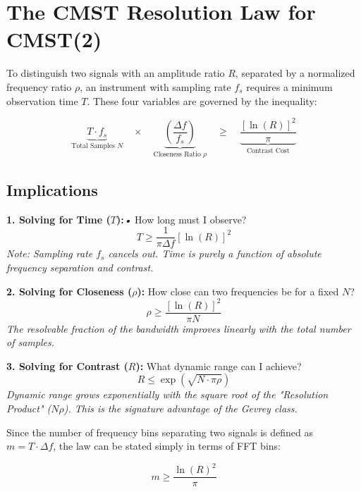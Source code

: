 \documentclass[11pt]{article}
\theoremstyle{breakdef}
\begin{document}
\section{The CMST Resolution Law for CMST(2)}

To distinguish two signals with an amplitude ratio $R$, separated by a normalized frequency ratio $\rho$, an instrument with sampling rate $f_s$ requires a minimum observation time $T$. These four variables are governed by the inequality:

\begin{equation}
    \underbrace{T \cdot f_s}_{\text{Total Samples } N} \quad \times \quad \underbrace{\left( \frac{\Delta f}{f_s} \right)}_{\text{Closeness Ratio } \rho} \quad \ge \quad \underbrace{ \frac{\left[ \ln(R) \right]^2}{\pi} }_{\text{Contrast Cost}}
\end{equation}

\subsection{Implications}

\textbf{1. Solving for Time ($T$):}\textit{\textit{•}}
How long must I observe?
\begin{equation}
    T \ge \frac{1}{\pi \Delta f} [\ln(R)]^2
\end{equation}
\textit{Note: Sampling rate $f_s$ cancels out. Time is purely a function of absolute frequency separation and contrast.}

\textbf{2. Solving for Closeness ($\rho$):}
How close can two frequencies be for a fixed $N$?
\begin{equation}
    \rho \ge \frac{[\ln(R)]^2}{\pi N}
\end{equation}
\textit{The resolvable fraction of the bandwidth improves linearly with the total number of samples.}

\textbf{3. Solving for Contrast ($R$):}
What dynamic range can I achieve?
\begin{equation}
    R \le \exp\left( \sqrt{N \cdot \pi \rho} \right)
\end{equation}
\textit{Dynamic range grows exponentially with the square root of the "Resolution Product" ($N \rho$). This is the signature advantage of the Gevrey class.}

Since the number of frequency bins separating two signals is defined as $m = T \cdot \Delta f$, the law can be stated simply in terms of FFT bins:

\begin{equation}
    m \ge \frac{ \ln(R)^2}{\pi}
\end{equation}
\end{document}
